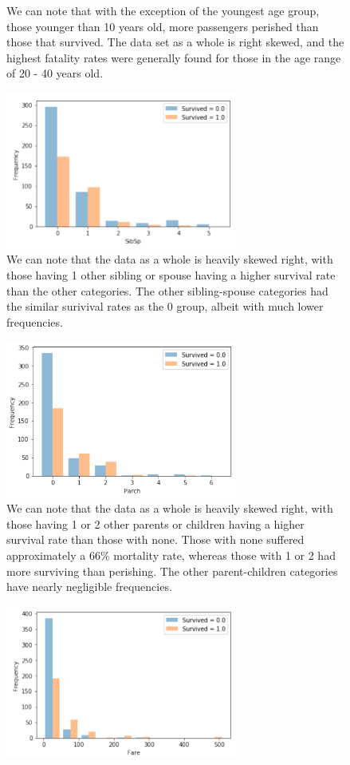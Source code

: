 \documentclass[11pt]{article}
\begin{document}
\begin{enumerate}
{\begin{figure}[!htbp]
    \caption{We can note that with the exception of the youngest age group, those younger than 10 years old, more passengers perished than those that survived. The data set as a whole is right skewed, and the highest fatality rates were generally found for those in the age range of 20 - 40 years old.}
\end{figure}
\begin{figure}[!htbp]
    \centering
    \includegraphics[width=3in]{5a-sibsp.png}
    \caption{We can note that the data as a whole is heavily skewed right, with those having 1 other sibling or spouse having a higher survival rate than the other categories. The other sibling-spouse categories had the similar surivival rates as the 0 group, albeit with much lower frequencies.}
\end{figure}
\begin{figure}[!htbp]
    \centering
    \includegraphics[width=3in]{5a-parch.png}
    \caption{We can note that the data as a whole is heavily skewed right, with those having 1 or 2 other parents or children having a higher survival rate than those with none. Those with none suffered approximately a 66\% mortality rate, whereas those with 1 or 2 had more surviving than perishing. The other parent-children categories have nearly negligible frequencies.}
\end{figure}
\begin{figure}[!htbp]
    \centering
    \includegraphics[width=3in]{5a-fare.png}

\end{figure}}
\end{enumerate}
\end{document}
